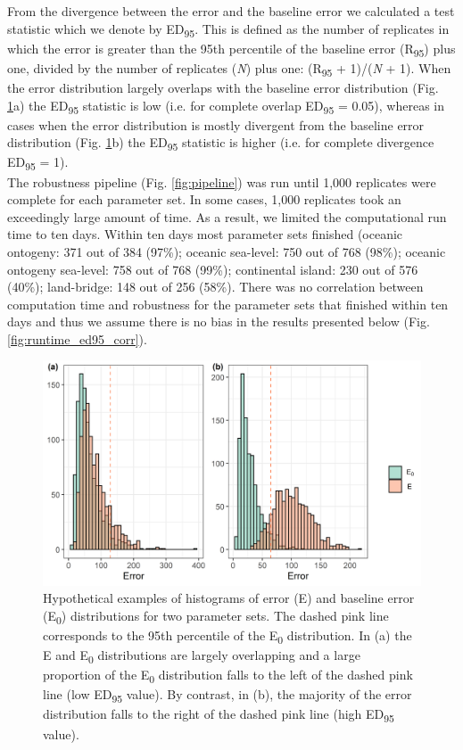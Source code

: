 \documentclass{article}
\begin{document}
\clearpage

From the divergence between the error and the baseline error we calculated a test statistic which we denote by ED\textsubscript{95}. This is defined as the number of replicates in which the error is greater than the 95th percentile of the baseline error (R\textsubscript{95}) plus one, divided by the number of replicates (\textit{N}) plus one: (R\textsubscript{95} + 1)/(\textit{N} + 1). When the error distribution largely overlaps with the baseline error distribution (Fig. \ref{fig:hist_spec_nltt}a) the ED\textsubscript{95} statistic is low (i.e. for complete overlap ED\textsubscript{95} = 0.05), whereas in cases when the error distribution is mostly divergent from the baseline error distribution (Fig. \ref{fig:hist_spec_nltt}b) the ED\textsubscript{95} statistic is higher (i.e. for complete divergence ED\textsubscript{95} = 1). \\

The robustness pipeline (Fig. \ref{fig:pipeline}) was run until 1,000 replicates were complete for each parameter set. In some cases, 1,000 replicates took an exceedingly large amount of time. As a result, we limited the computational run time to ten days. Within ten days most parameter sets finished (oceanic ontogeny: 371 out of 384 (97\%); oceanic sea-level: 750 out of 768 (98\%); oceanic ontogeny sea-level: 758 out of 768 (99\%); continental island: 230 out of 576 (40\%); land-bridge: 148 out of 256 (58\%). There was no correlation between computation time and robustness for the parameter sets that finished within ten days and thus we assume there is no bias in the results presented below (Fig. \ref{fig:runtime_ed95_corr}).

\clearpage

\begin{figure}
    \centering
    \includegraphics{hist_spec_nltt.png}
    \caption{Hypothetical examples of histograms of error (E) and baseline error (E\textsubscript{0}) distributions for two parameter sets. The dashed pink line corresponds to the 95th percentile of the E\textsubscript{0} distribution. In (a) the E and E\textsubscript{0} distributions are largely overlapping and a large proportion of the E\textsubscript{0} distribution falls to the left of the dashed pink line (low ED\textsubscript{95} value). By contrast, in (b), the majority of the error distribution falls to the right of the dashed pink line (high ED\textsubscript{95} value).}
    \label{fig:hist_spec_nltt}
\end{figure}
\end{document}
